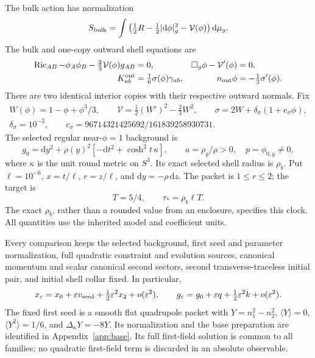 \documentclass[11pt]{article}
\newcommand{\eps}{\varepsilon}
\newcommand{\dd}{\mathrm d}
\newcommand{\av}[1]{\langle #1\rangle}
\newcommand{\cV}{\mathcal V}
\begin{document}
The bulk action has normalization
\begin{equation}
 S_{\rm bulk}=\int\left(\tfrac12R-\tfrac12|\dd\phi|_g^2-\cV(\phi)\right)
 \dd\mu_g.
 \label{eq:action}
\end{equation}
The bulk and one-copy outward shell equations are
\begin{align}
 \operatorname{Ric}_{AB}-\phi_A\phi_B-\tfrac23\cV(\phi)g_{AB}&=0,
 &\Box_g\phi-\cV'(\phi)&=0,\label{eq:bulk}\\
 K^{\rm out}_{ab}&=\tfrac16\sigma(\phi)\gamma_{ab},
 &n_{\rm out}\phi&=-\tfrac12\sigma'(\phi).\label{eq:shell}
\end{align}
There are two identical interior copies with their respective outward
normals. Fix
\begin{gather}
 W(\phi)=1-\phi+\phi^3/3,\qquad
 \cV=\tfrac12(W')^2-\tfrac23W^2,\qquad
 \sigma=2W+\delta_\sigma(1+c_\sigma\phi),\nonumber\\
 \delta_\sigma=10^{-3},\qquad
 c_\sigma=96714321425692/161839258930731.
 \label{eq:potential}
\end{gather}
The selected regular near-$\phi=1$ background is
\begin{equation}
 g_0=\dd y^2+\rho(y)^2[-\dd t^2+\cosh^2t\,\kappa],\qquad
 a=\rho_y/\rho>0,\quad p=\phi_{0,y}\ne0,
 \label{eq:background}
\end{equation}
where $\kappa$ is the unit round metric on $S^3$. Its exact selected shell
radius is $\rho_b$. Put $\ell=10^{-6}$, $x=t/\ell$, $r=z/\ell$, and
$\dd y=-\rho\,\dd z$. The packet is $1\le r\le2$; the target is
\begin{equation}
 T=5/4,\qquad \tau_*=\rho_b\ell T.
 \label{eq:target}
\end{equation}
The exact $\rho_b$, rather than a rounded value from an enclosure, specifies
this clock. All quantities use the inherited model and coefficient units.

Every comparison keeps the selected background, first seed and parameter
normalization, full quadratic constraint and evolution sources, canonical
momentum and scalar canonical second sectors, second transverse-traceless
initial pair, and initial shell collar fixed. In particular,
\begin{equation}
 x_\eps=x_0+\eps v_{\rm seed}+\tfrac12\eps^2x_2+o(\eps^2),\qquad
 g_\eps=g_0+\eps q+\tfrac12\eps^2k+o(\eps^2).
 \label{eq:normalization}
\end{equation}
The fixed first seed is a smooth flat quadrupole packet with
$Y=n_1^2-n_2^2$, $\av Y=0$, $\av{Y^2}=1/6$, and
$\Delta_\kappa Y=-8Y$. Its normalization and the base preparation are
identified in Appendix~\ref{app:base}. Its full first-field solution is
common to all families; no quadratic first-field term is discarded in an
absolute observable.
\end{document}

